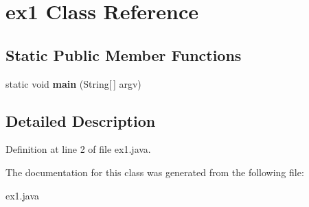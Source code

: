 \section{ex1 Class Reference}
\label{classex1}
\subsection*{Static Public Member Functions}
\begin{DoxyCompactItemize}
\item 
static void {\bfseries main} (String[$\,$] argv)\label{classex1_af175fde2d41f8bf6fb56ea31cd0303eb}

\end{DoxyCompactItemize}


\subsection{Detailed Description}


Definition at line 2 of file ex1.java.



The documentation for this class was generated from the following file:\begin{DoxyCompactItemize}
\item 
ex1.java\end{DoxyCompactItemize}
